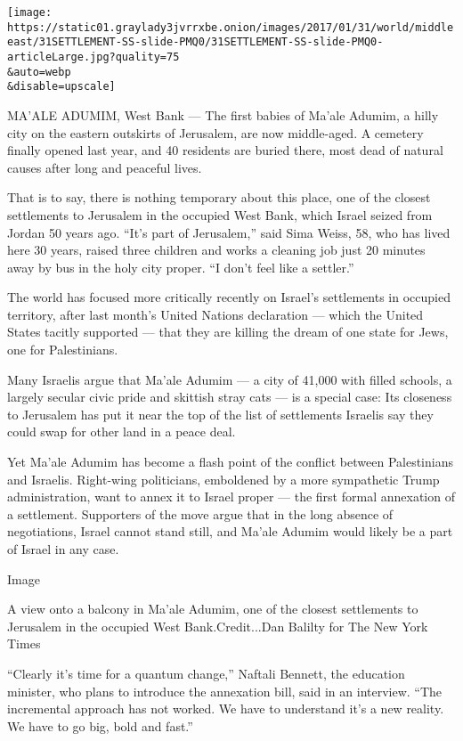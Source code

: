 \texttt{[image: https://static01.graylady3jvrrxbe.onion/images/2017/01/31/world/middleeast/31SETTLEMENT-SS-slide-PMQ0/31SETTLEMENT-SS-slide-PMQ0-articleLarge.jpg?quality=75\\\&auto=webp\\\&disable=upscale]}

MA'ALE ADUMIM, West Bank --- The first babies of Ma'ale Adumim, a hilly
city on the eastern outskirts of Jerusalem, are now middle-aged. A
cemetery finally opened last year, and 40 residents are buried there,
most dead of natural causes after long and peaceful lives.

That is to say, there is nothing temporary about this place, one of the
closest settlements to Jerusalem in the occupied West Bank, which Israel
seized from Jordan 50 years ago. ``It's part of Jerusalem,'' said Sima
Weiss, 58, who has lived here 30 years, raised three children and works
a cleaning job just 20 minutes away by bus in the holy city proper. ``I
don't feel like a settler.''

The world has focused more critically recently on Israel's settlements
in occupied territory, after last month's United Nations declaration ---
which the United States tacitly supported --- that they are killing the
dream of one state for Jews, one for Palestinians.

Many Israelis argue that Ma'ale Adumim --- a city of 41,000 with filled
schools, a largely secular civic pride and skittish stray cats --- is a
special case: Its closeness to Jerusalem has put it near the top of the
list of settlements Israelis say they could swap for other land in a
peace deal.

Yet Ma'ale Adumim has become a flash point of the conflict between
Palestinians and Israelis. Right-wing politicians, emboldened by a more
sympathetic Trump administration, want to annex it to Israel proper ---
the first formal annexation of a settlement. Supporters of the move
argue that in the long absence of negotiations, Israel cannot stand
still, and Ma'ale Adumim would likely be a part of Israel in any case.

Image

A view onto a balcony in Ma'ale Adumim, one of the closest settlements
to Jerusalem in the occupied West Bank.Credit...Dan Balilty for The New
York Times

``Clearly it's time for a quantum change,'' Naftali Bennett, the
education minister, who plans to introduce the annexation bill, said in
an interview. ``The incremental approach has not worked. We have to
understand it's a new reality. We have to go big, bold and fast.''

